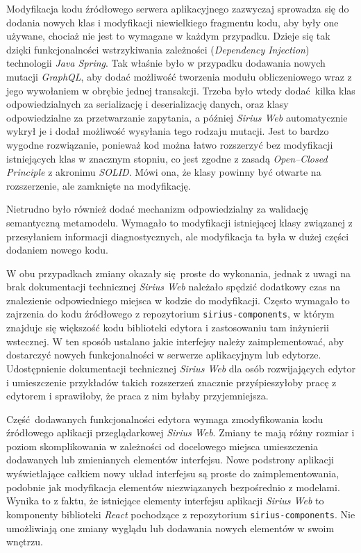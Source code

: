 Modyfikacja kodu źródłowego serwera aplikacyjnego zazwyczaj sprowadza się do
dodania nowych klas i modyfikacji niewielkiego fragmentu kodu, aby były one
używane, chociaż nie jest to wymagane w każdym przypadku. Dzieje się tak dzięki
funkcjonalności wstrzykiwania zależności (\emph{Dependency Injection})
technologii \emph{Java Spring}. Tak właśnie było w przypadku dodawania nowych
mutacji \emph{GraphQL}, aby dodać możliwość tworzenia modułu obliczeniowego
wraz z jego wywołaniem w obrębie jednej transakcji. Trzeba było wtedy
dodać kilka klas odpowiedzialnych za serializację i deserializację danych, oraz
klasy odpowiedzialne za przetwarzanie zapytania, a później \emph{Sirius Web}
automatycznie wykrył je i dodał możliwość wysyłania tego rodzaju mutacji.
Jest to bardzo wygodne rozwiązanie, ponieważ kod można łatwo rozszerzyć bez
modyfikacji istniejących klas w znacznym stopniu, co jest zgodne z
zasadą \emph{Open--Closed Principle} %
z akronimu \emph{SOLID}. Mówi ona, że klasy powinny być otwarte na
rozszerzenie, ale zamknięte na modyfikację.

Nietrudno było również dodać mechanizm odpowiedzialny za walidację semantyczną
metamodelu. Wymagało to modyfikacji istniejącej klasy związanej z przesyłaniem
informacji diagnostycznych, ale modyfikacja ta była w dużej części dodaniem
nowego kodu.

W obu przypadkach zmiany okazały się proste do wykonania, jednak z uwagi na
brak dokumentacji technicznej \emph{Sirius Web} należało spędzić dodatkowy czas
na znalezienie odpowiedniego miejsca w kodzie do modyfikacji. Często wymagało
to zajrzenia do kodu źródłowego z repozytorium \texttt{sirius-components}, w
którym znajduje się większość kodu biblioteki edytora i zastosowaniu tam
inżynierii wstecznej. W ten sposób ustalano jakie interfejsy należy
zaimplementować, aby dostarczyć nowych funkcjonalności w serwerze aplikacyjnym
lub edytorze. Udostępnienie dokumentacji technicznej \emph{Sirius Web} dla osób
rozwijających edytor i umieszczenie przykładów takich rozszerzeń znacznie
przyśpieszyłoby pracę z edytorem i sprawiłoby, że praca z nim byłaby
przyjemniejsza.

Część dodawanych funkcjonalności edytora wymaga zmodyfikowania kodu źródłowego
aplikacji przeglądarkowej \emph{Sirius Web}. Zmiany te mają różny rozmiar i
poziom skomplikowania w zależności od docelowego miejsca umieszczenia
dodawanych lub zmienianych elementów interfejsu.
Nowe podstrony aplikacji wyświetlające całkiem nowy układ interfejsu są proste
do zaimplementowania, podobnie jak modyfikacja elementów niezwiązanych
bezpośrednio z modelami. Wynika to z faktu, że istniejące elementy interfejsu
aplikacji \emph{Sirius Web} to komponenty biblioteki \emph{React} pochodzące z
repozytorium \texttt{sirius-components}. Nie umożliwiają one zmiany wyglądu lub
dodawania nowych elementów w swoim wnętrzu.

